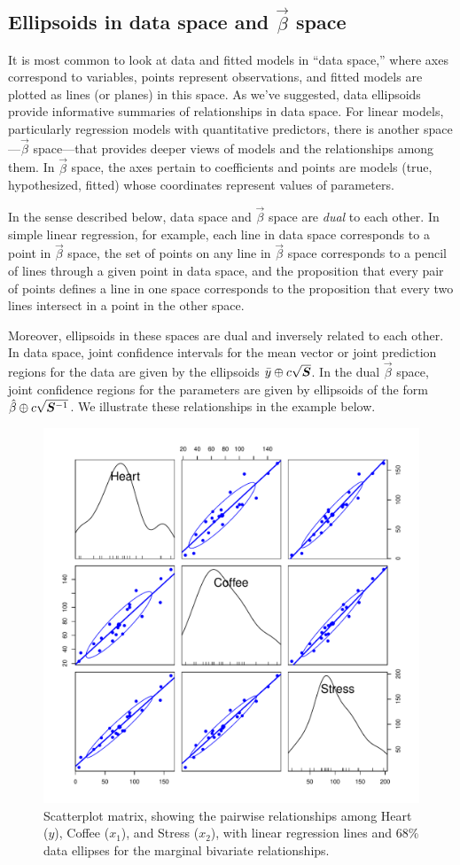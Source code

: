 \subsection[Ellipsoids in data space and beta space]{Ellipsoids in data space and $\vec{\beta}$ space}

It is most common to look at data and fitted models in ``data space,'' where axes correspond to
variables, points represent observations, and fitted models are plotted as lines (or planes) in this space.
As we've suggested, data ellipsoids provide informative summaries of relationships in data space.
For linear models, particularly regression models with quantitative predictors, there is another space---$\vec{\beta}$ space---that provides deeper views of models and the relationships among them.
In $\vec{\beta}$ space, the axes pertain to coefficients and points are models (true, hypothesized, fitted) whose coordinates
represent values of parameters.

In the sense described below, data space and $\vec{\beta}$ space are \emph{dual} to each other.
In simple linear regression, for example, each line in data space corresponds to a point in $\vec{\beta}$ space,
the set of points on any line in $\vec{\beta}$ space corresponds to a pencil of lines through a given point
in data space, and the proposition that every pair of points defines a line in one space corresponds to
the proposition that every two lines intersect in a point in the other space.

Moreover, ellipsoids in these spaces are dual and inversely related to each other.
In data space, joint confidence intervals for the mean vector or joint prediction
regions for the data are given by the ellipsoids $\bar{y} \oplus c \sqrt{\bm{S}}$.
In the dual $\vec{\beta}$ space, joint confidence regions for the parameters
are given by ellipsoids of the form $\hat{\beta} \oplus c \sqrt{\bm{S}^{-1}}$.
We illustrate these relationships in the example below.

\begin{figure}[htb]
  \centering
  \includegraphics[width=.6\textwidth,clip]{fig/vis-reg-coffee11}
  \caption{Scatterplot matrix, showing the pairwise relationships among Heart ($y$), Coffee ($x_1$), and Stress ($x_2$),
  with linear regression lines and 68\% data ellipses for the marginal bivariate relationships.
  }%
  \label{fig:vis-reg-coffee11}
\end{figure}


